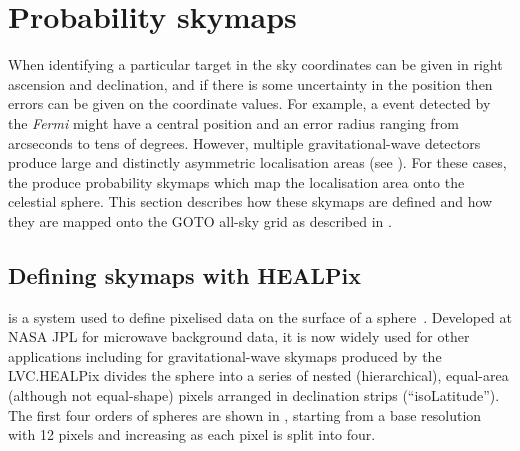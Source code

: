 \section{Probability skymaps}
\label{sec:skymaps}
\begin{colsection}


\begin{colsection}

When identifying a particular target in the sky coordinates can be given in right ascension and declination, and if there is some uncertainty in the position then errors can be given on the coordinate values. For example, a  event detected by the \textit{Fermi}  might have a central position and an error radius ranging from arcseconds to tens of degrees. However, multiple gravitational-wave detectors produce large and distinctly asymmetric localisation areas (see ). For these cases, the  produce probability skymaps which map the localisation area onto the celestial sphere. This section describes how these skymaps are defined and how they are mapped onto the GOTO all-sky grid as described in .

\end{colsection}


\subsection{Defining skymaps with HEALPix}
\label{sec:healpix}
\begin{colsection}

 is a system used to define pixelised data on the surface of a sphere~\citep{HEALPix}. Developed at NASA JPL for microwave background data, it is now widely used for other applications including for gravitational-wave skymaps produced by the LVC.\@ HEALPix divides the sphere into a series of nested (hierarchical), equal-area (although not equal-shape) pixels arranged in declination strips (``isoLatitude''). The first four orders of spheres are shown in , starting from a base resolution with 12 pixels and increasing as each pixel is split into four.


\end{colsection}
\end{colsection}
